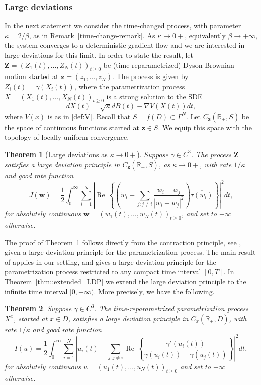 \documentclass[11pt]{article}
\renewcommand{\Re}{\operatorname{Re}\,}
\numberwithin{equation}{section}
\newtheorem{theorem}{Theorem}[section]
\theoremstyle{definition}
\begin{document}
\subsubsection*{Large deviations}
In the next statement we consider the time-changed process, with parameter $\kappa = 2/\beta$, as in Remark~\ref{time-change-remark}. As $\kappa \to 0+$, equivalently $\beta \to +\infty$, the system converges to a deterministic gradient flow and we are interested in large deviations for this limit. In order to state the result, let $\boldsymbol{Z}= (Z_{1}(t),\dots,Z_{N}(t))_{t\ge 0}$ be (time-reparametrized) Dyson Brownian motion started at $\boldsymbol{z} = (z_{1},\dots,z_{N})$. The process is given by $Z_{i}(t) = \gamma(X_{i}(t))$, where the parametrization process $X = (X_{1}(t),\dots,X_{N}(t))_{t\ge 0}$ is a strong solution to the SDE
    \[
        dX(t) =\sqrt{\kappa}dB(t)  - \nabla V(X(t))dt,
    \]
    where $V(x)$ is as in \eqref{def:V}. Recall that $S = f(D) \subset \Gamma^N$. Let $C_{\boldsymbol{z}}(\mathbb{R}_+, S)$ be the space of continuous functions started at $\boldsymbol{z}\in S$. We equip this space with the topology of locally uniform convergence. 
\begin{theorem}[Large deviations as $\kappa \to 0+$]\label{thm::LDP_Z}
     Suppose $\gamma\in C^{3}$. The process $\boldsymbol{Z}$ satisfies a large deviation principle in $C_{{\boldsymbol{z}}}(\mathbb{R}_+, S)$, as $\kappa \to 0+$, with rate $1/\kappa$ and good rate function
    \[
        J(\boldsymbol{w}) 
        = \frac{1}{2}\int_{0}^{\infty}\sum\limits_{i=1}^{N}\left|\Re\left\{\left(\dot w_{i} - \sum\limits_{j:j\neq i}\frac{w_{i}-w_{j}}{|w_{i}-w_{j}|^{2}}\right)\overline{\tau(w_{i})}\right\}\right|^2dt,
    \]
     for absolutely continuous $\boldsymbol{w} = (w_{1}(t), \dots, w_{N}(t))_{t\ge 0}$, and set to $+\infty$ otherwise.
\end{theorem}
The proof of Theorem~\ref{thm::LDP_Z} follows directly from the contraction principle, see \cite{dembo2009large}, given a large deviation principle  for the parametrization process. The main result  of \cite{abuzaid2024large} applies in our setting, and gives a large deviation principle for the parametrization process restricted to any compact time interval $[0,T]$. In Theorem~\ref{thm::extended_LDP} we extend the large deviation principle to the infinite time interval $[0,+\infty)$. More precisely, we have the following.
\begin{theorem}\label{thm:LDP_parametrization_process_infinite_time}
   Suppose $\gamma \in C^3$. The time-reparametrized parametrization process $X^{x}$, started at $x\in D$, satisfies a large deviation principle in $C_{x}(\mathbb{R}_{+}, D)$, with rate $1/\kappa$ and good rate function
    \[
        I(u) = \frac{1}{2}\int_{0}^{\infty}\sum\limits_{i=1}^{N}\left|\dot u_{i}(t) - \sum\limits_{j:j\neq i}\Re\left\{\frac{\gamma'(u_{i}(t))}{\gamma(u_{i}(t))-\gamma(u_{j}(t))}\right\}\right|^2dt,
    \]
for absolutely continuous $u = (u_{1}(t),\dots, u_{N}(t))_{t\ge 0}$ and set to $+\infty$ otherwise.
\end{theorem}
\end{document}
